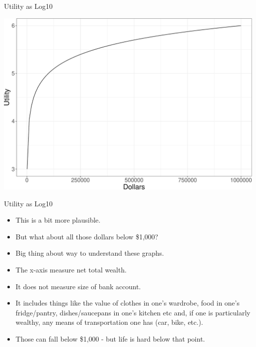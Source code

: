 \documentclass[
  ignorenonframetext,
]{beamer}
\providecommand{\tightlist}{%
  \setlength{\itemsep}{0pt}\setlength{\parskip}{0pt}}
\renewcommand{\,}{\text{, }}
\begin{document}
\begin{frame}{Utility as Log10}
\protect\hypertarget{utility-as-log10}{}

\begin{center}


\includegraphics[width=0.9\linewidth]{Lecture_4_m_e_files/figure-beamer/unnamed-chunk-2-1} 

\end{center}

\end{frame}

\begin{frame}{Utility as Log10}
\protect\hypertarget{utility-as-log10-1}{}

\begin{itemize}
\tightlist
\item
  This is a bit more plausible.
\item
  But what about all those dollars below \$1,000?
\item
  Big thing about way to understand these graphs.
\item
  The x-axis measure net total wealth.
\item
  It does not measure size of bank account.
\item
  It includes things like the value of clothes in one's wardrobe, food
  in one's fridge/pantry, dishes/saucepans in one's kitchen etc and, if
  one is particularly wealthy, any means of transportation one has (car,
  bike, etc.).
\item
  Those can fall below \$1,000 - but life is hard below that point.
\end{itemize}

\end{frame}
\end{document}

